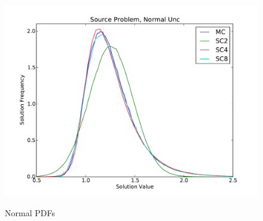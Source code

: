 \documentclass[11pt]{article} %
\begin{document}
\begin{figure}[h!]
\centering
   \includegraphics[width=\textwidth]{../graphics/source_normal_pdfs}
   \label{norm}
   \caption{Normal PDFs}
\end{figure}
\end{document}
